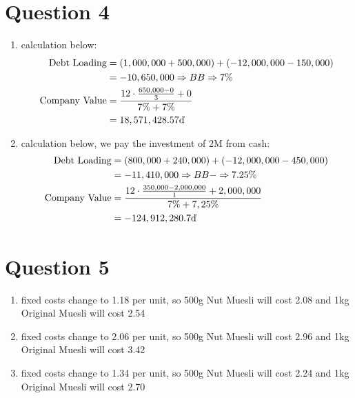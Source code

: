 \documentclass{article}
\begin{document}
	\section*{Question 4}
	\begin{enumerate}[label=(\alph*)]
		\item calculation below:
		\begin{align}
			\text{Debt Loading} &= (1,000,000 + 500,000) + (-12,000,000 - 150,000) \notag \\
			&= -10,650,000 \Rightarrow BB \Rightarrow 7\% \notag \\
			\text{Company Value} &= \frac{12\cdot \frac{650,000 - 0}{3} + 0}{7\% + 7\%} \notag \\
			&= 18,571,428.57 \EUR \notag
		\end{align}
		\item calculation below, we pay the investment of 2M from cash:
		\begin{align}
			\text{Debt Loading} &= (800,000 + 240,000) + (-12,000,000 - 450,000) \notag \\
			&= -11,410,000 \Rightarrow BB- \Rightarrow 7.25\% \notag \\
			\text{Company Value} &= \frac{12\cdot \frac{350,000 - 2,000,000}{1} + 2,000,000}{7\% + 7,25\%} \notag \\
			&= -124,912,280.7 \EUR \notag
		\end{align}
	\end{enumerate}
	
	\section*{Question 5}
	\begin{enumerate}[label=(\alph*)]
		\item fixed costs change to 1.18 per unit, so 500g Nut Muesli will cost 2.08 and 1kg Original Muesli will cost 2.54
		\item fixed costs change to 2.06 per unit, so 500g Nut Muesli will cost 2.96 and 1kg Original Muesli will cost 3.42
		\item fixed costs change to 1.34 per unit, so 500g Nut Muesli will cost 2.24 and 1kg Original Muesli will cost 2.70
	\end{enumerate}
\end{document}
